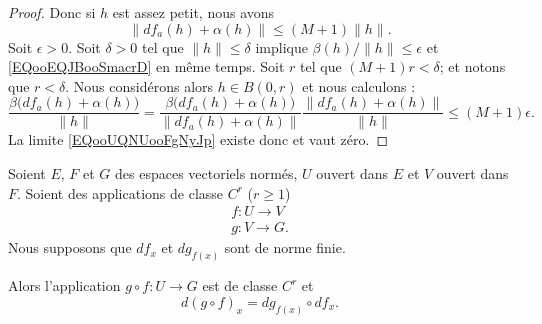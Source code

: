 \begin{proof}
	Donc si \( h\) est assez petit, nous avons
	\begin{equation}        \label{EQooEQJBooSmacrD}
		\| df_a(h)+\alpha(h) \|\leq (M+1)\| h \|.
	\end{equation}
	Soit \( \epsilon>0\). Soit \( \delta>0\) tel que \( \| h \|\leq \delta\) implique \( \beta(h)/\| h \|\leq \epsilon\) et \eqref{EQooEQJBooSmacrD} en même temps. Soit \( r\) tel que \( (M+1)r<\delta\); et notons que \( r<\delta\). Nous considérons alors \( h\in B(0,r)\) et nous calculons :
	\begin{equation}
		\frac{ \beta\big( df_a(h)+\alpha(h) \big) }{ \| h \| }=\frac{ \beta\big( df_a(h)+\alpha(h) \big) }{ \| df_a(h)+\alpha(h) \| }\frac{ \| df_a(h)+\alpha(h) \| }{ \| h \| }\leq (M+1)\epsilon.
	\end{equation}
	La limite \eqref{EQooUQNUooFgNyJp} existe donc et vaut zéro.
\end{proof}

\begin{theorem}    \label{ThoAGXGuEt}
	Soient \( E\), \( F\) et \( G\) des espaces vectoriels normés, \( U\) ouvert dans \( E\) et \( V\) ouvert dans \( F\). Soient des applications de classe \( C^r\) (\( r\geq 1\))
	\begin{subequations}
		\begin{align}
			f\colon U\to V \\
			g\colon V\to G.
		\end{align}
	\end{subequations}
	Nous supposons que \( df_x\) et \( dg_{f(x)}\) sont de norme finie.

	Alors l'application \( g\circ f\colon U\to G\) est de classe \( C^r\) et
	\begin{equation}\label{EqHFmezmr}
		d(g\circ f)_x=dg_{f(x)}\circ df_x.
	\end{equation}
\end{theorem}

